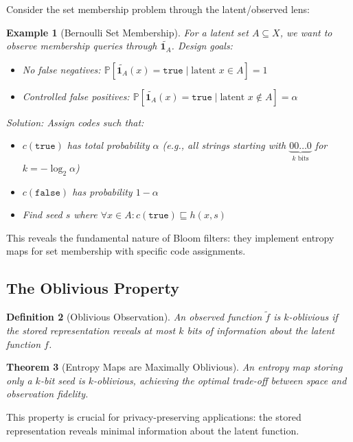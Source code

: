 \documentclass[11pt,final,hidelinks]{article}
\newtheorem{theorem}{Theorem}[section]
\newtheorem{definition}[theorem]{Definition}
\newtheorem{example}[theorem]{Example}
\newcommand{\obs}[1]{\widetilde{#1}}  %
\newcommand{\Indicator}[1]{\mathbf{1}_{#1}}
\newcommand{\ProbCond}[2]{\mathbb{P}\left[#1 \mid #2\right]}
\newcommand{\fprate}{\alpha}
\newcommand{\True}{\mathtt{true}}
\newcommand{\False}{\mathtt{false}}
\begin{document}
Consider the set membership problem through the latent/observed lens:

\begin{example}[Bernoulli Set Membership]
For a latent set $A \subseteq X$, we want to observe membership queries through $\obs{\Indicator{A}}$. Design goals:
\begin{itemize}
    \item No false negatives: $\ProbCond{\obs{\Indicator{A}}(x) = \True}{\text{latent } x \in A} = 1$
    \item Controlled false positives: $\ProbCond{\obs{\Indicator{A}}(x) = \True}{\text{latent } x \notin A} = \fprate$
\end{itemize}

Solution: Assign codes such that:
\begin{itemize}
    \item $c(\True)$ has total probability $\fprate$ (e.g., all strings starting with $\underbrace{00\ldots0}_{k \text{ bits}}$ for $k = -\log_2 \fprate$)
    \item $c(\False)$ has probability $1 - \fprate$
    \item Find seed $s$ where $\forall x \in A: c(\True) \sqsubseteq h(x, s)$
\end{itemize}
\end{example}

This reveals the fundamental nature of Bloom filters: they implement entropy maps for set membership with specific code assignments.

\subsection{The Oblivious Property}

\begin{definition}[Oblivious Observation]
An observed function $\obs{f}$ is $k$-oblivious if the stored representation reveals at most $k$ bits of information about the latent function $f$.
\end{definition}

\begin{theorem}[Entropy Maps are Maximally Oblivious]
An entropy map storing only a $k$-bit seed is $k$-oblivious, achieving the optimal trade-off between space and observation fidelity.
\end{theorem}

This property is crucial for privacy-preserving applications: the stored representation reveals minimal information about the latent function.
\end{document}
